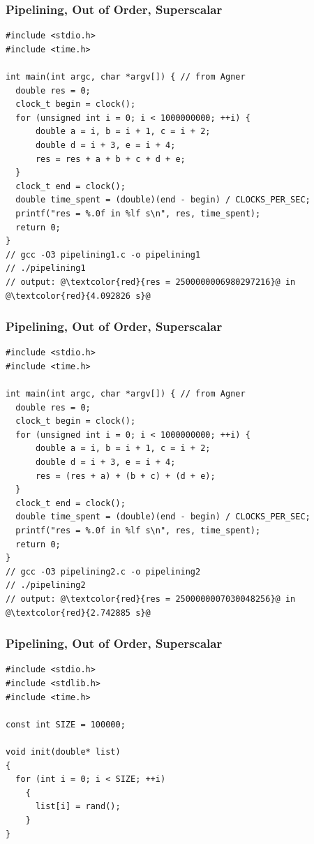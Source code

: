 \documentclass{beamer}
\begin{document}
\begin{frame}[fragile]
\frametitle{Pipelining, Out of Order, Superscalar}
\scriptsize
\begin{lstlisting}[linebackgroundcolor={\lstcolorlines{10}}]
#include <stdio.h>
#include <time.h>

int main(int argc, char *argv[]) { // from Agner
  double res = 0;
  clock_t begin = clock();
  for (unsigned int i = 0; i < 1000000000; ++i) {
      double a = i, b = i + 1, c = i + 2;
      double d = i + 3, e = i + 4;
      res = res + a + b + c + d + e;
  }
  clock_t end = clock();
  double time_spent = (double)(end - begin) / CLOCKS_PER_SEC;
  printf("res = %.0f in %lf s\n", res, time_spent);
  return 0;
}
// gcc -O3 pipelining1.c -o pipelining1
// ./pipelining1
// output: @\textcolor{red}{res = 2500000006980297216}@ in @\textcolor{red}{4.092826 s}@
\end{lstlisting}

\end{frame}

\begin{frame}[fragile]
\frametitle{Pipelining, Out of Order, Superscalar}
\scriptsize
\begin{lstlisting}[linebackgroundcolor={\lstcolorlines{10}}]
#include <stdio.h>
#include <time.h>

int main(int argc, char *argv[]) { // from Agner
  double res = 0;
  clock_t begin = clock();
  for (unsigned int i = 0; i < 1000000000; ++i) {
      double a = i, b = i + 1, c = i + 2;
      double d = i + 3, e = i + 4;
      res = (res + a) + (b + c) + (d + e);
  }
  clock_t end = clock();
  double time_spent = (double)(end - begin) / CLOCKS_PER_SEC;
  printf("res = %.0f in %lf s\n", res, time_spent);
  return 0;
}
// gcc -O3 pipelining2.c -o pipelining2
// ./pipelining2
// output: @\textcolor{red}{res = 2500000007030048256}@ in @\textcolor{red}{2.742885 s}@
\end{lstlisting}

\end{frame}

\begin{frame}[fragile]
\frametitle{Pipelining, Out of Order, Superscalar}
\scriptsize
\begin{lstlisting}
#include <stdio.h>
#include <stdlib.h>
#include <time.h>

const int SIZE = 100000;

void init(double* list)
{
  for (int i = 0; i < SIZE; ++i)
    {
      list[i] = rand();
    }
}
\end{lstlisting}

\end{frame}
\end{document}
